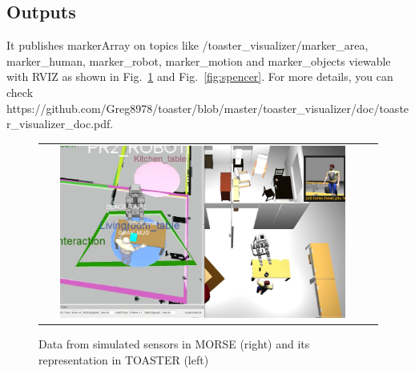 \documentclass[a4paper]{article}
\begin{document}
\subsection{Outputs}
It publishes markerArray on topics like /toaster\_visualizer/marker\_area, marker\_human, marker\_robot, marker\_motion and marker\_objects viewable with RVIZ as shown in Fig.~\ref{fig:simu} and Fig.~\ref{fig:spencer}. For more details, you can check https://github.com/Greg8978/toaster/blob/master/toaster\_visualizer/doc/toaster\_visualizer\_doc.pdf.
 \begin{figure}[ht!]

 \centering
 \begin{tabular}{cc}
  \includegraphics[width=0.9\textwidth]{img/tosaster.jpg}
 \end{tabular}
 \caption{Data from simulated sensors in MORSE (right) and its representation in TOASTER (left)}
 \label{fig:simu}
 \end{figure}
 
\end{document}
